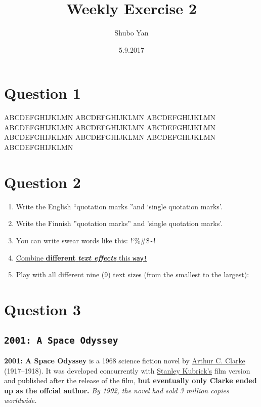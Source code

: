 \documentclass[a4paper,12pt]{article}
\title{ Weekly Exercise 2}
\author{Shubo Yan }
\date{5.9.2017}
\begin{document}
\maketitle


\section{Question 1}
ABCDEFGHIJKLMN%
ABCDEFGHIJKLMN%
ABCDEFGHIJKLMN%
ABCDEFGHIJKLMN%
ABCDEFGHIJKLMN%
ABCDEFGHIJKLMN%
ABCDEFGHIJKLMN%
ABCDEFGHIJKLMN%
ABCDEFGHIJKLMN%
ABCDEFGHIJKLMN

\section{Question 2}

\begin{enumerate}

\item Write the English  ``quotation marks ''and  `single quotation marks'.
\item Write the Finnish  ''quotation marks''  and 'single quotation marks'.
\item You can write swear words like this: !`\%\#\$\euro@\~{}\texteuro!
\item \underline{\underline{Combine} \underline{\textbf{different}} \textsl{\textbf{text effects}}  \underline{this \texttt{way!}}}
\item Play with all different nine (9) text sizes (from the smallest to the largest): \linebreak{}
\end{enumerate}
\pagebreak

\section{Question 3}

\subsection*{\texttt{2001: A Space Odyssey}}

\textbf{2001: A Space Odyssey} is a 1968 science fiction novel by \underline{Arthur C. Clarke} (1917--1918).
It was developed concurrently with \underline{Stanley Kubrick's} film
\linebreak 
version and published after the release of the film,
\textbf{ but eventually only \linebreak 
Clarke ended up as the offcial author.}
\emph{By 1992, the novel had sold 3 million copies worldwide.} 
\end{document}
